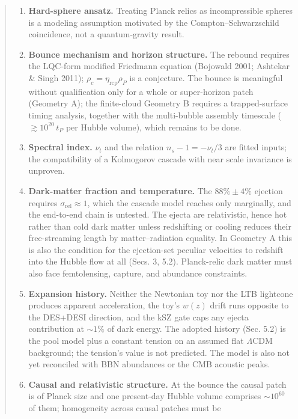 \documentclass[
]{article}
\providecommand{\tightlist}{%
  \setlength{\itemsep}{0pt}\setlength{\parskip}{0pt}}
\begin{document}
\begin{quote}
\begin{enumerate}
\def\labelenumi{\arabic{enumi}.}
\tightlist
\item
  \textbf{Hard-sphere ansatz.} Treating Planck relics as incompressible
  spheres is a modeling assumption motivated by the
  Compton--Schwarzschild coincidence, not a quantum-gravity result.
\item
  \textbf{Bounce mechanism and horizon structure.} The rebound requires
  the LQC-form modified Friedmann equation (Bojowald 2001; Ashtekar \&
  Singh 2011); \(\rho_c = \eta_{\text{rcp}}\rho_P\) is a conjecture. The
  bounce is meaningful without qualification only for a whole or
  super-horizon patch (Geometry A); the finite-cloud Geometry B requires
  a trapped-surface timing analysis, together with the multi-bubble
  assembly timescale (\(\gtrsim 10^{20}\,t_P\) per Hubble volume), which
  remains to be done.
\item
  \textbf{Spectral index.} \(\nu_t\) and the relation
  \(n_s - 1 = -\nu_t/3\) are fitted inputs; the compatibility of a
  Kolmogorov cascade with near scale invariance is unproven.
\item
  \textbf{Dark-matter fraction and temperature.} The \(88\% \pm 4\%\)
  ejection requires \(\sigma_{\text{rel}} \approx 1\), which the cascade
  model reaches only marginally, and the end-to-end chain is untested.
  The ejecta are relativistic, hence hot rather than cold dark matter
  unless redshifting or cooling reduces their free-streaming length by
  matter--radiation equality. In Geometry A this is also the condition
  for the ejection-set peculiar velocities to redshift into the Hubble
  flow at all (Secs. 3, 5.2). Planck-relic dark matter must also face
  femtolensing, capture, and abundance constraints.
\item
  \textbf{Expansion history.} Neither the Newtonian toy nor the LTB
  lightcone produces apparent acceleration, the toy's \(w(z)\) drift
  runs opposite to the DES+DESI direction, and the kSZ gate caps any
  ejecta contribution at \(\sim\!1\%\) of dark energy. The adopted
  history (Sec. 5.2) is the pool model plus a constant tension on an
  assumed flat \(\Lambda\)CDM background; the tension's value is not
  predicted. The model is also not yet reconciled with BBN abundances or
  the CMB acoustic peaks.
\item
  \textbf{Causal and relativistic structure.} At the bounce the causal
  patch is of Planck size and one present-day Hubble volume comprises
  \(\sim\!10^{60}\) of them; homogeneity across causal patches must be

\end{enumerate}
\end{quote}
\end{document}
